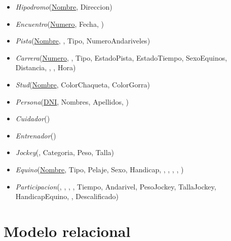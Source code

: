 \documentclass[a4paper,11pt]{article}
\begin{document}
\begin{itemize}

  \item \emph{Hipodromo}(\uline{Nombre}, Direccion)

  \item \emph{Encuentro}(\uline{Numero}, Fecha, )

  \item \emph{Pista}(\uline{Nombre}, \uline{}, 
    Tipo, NumeroAndariveles)

  \item \emph{Carrera}(\uline{Numero}, \uline{}, 
    Tipo, EstadoPista, EstadoTiempo, SexoEquinos, Distancia, , 
    , Hora)

  \item \emph{Stud}(\uline{Nombre}, ColorChaqueta, ColorGorra)

  \item \emph{Persona}(\uline{DNI}, Nombres, Apellidos, )

  \item \emph{Cuidador}(\uline{})

  \item \emph{Entrenador}(\uline{})

  \item \emph{Jockey}(\uline{}, Categoria, Peso, Talla)

  \item \emph{Equino}(\uline{Nombre}, Tipo, Pelaje, Sexo, Handicap, 
    , , , 
    , )

  \item \emph{Participacion}(\uline{}, 
    \uline{}, \uline{}, 
    \uline{}, Tiempo, Andarivel, PesoJockey, 
    TallaJockey, HandicapEquino, , Descalificado)


\end{itemize}

\section{Modelo relacional}
\end{document}
